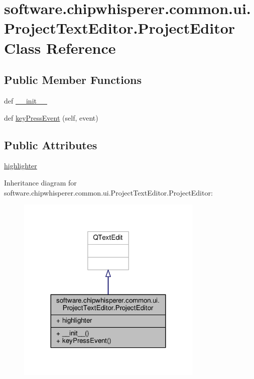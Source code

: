 \hypertarget{classsoftware_1_1chipwhisperer_1_1common_1_1ui_1_1ProjectTextEditor_1_1ProjectEditor}{}\section{software.\+chipwhisperer.\+common.\+ui.\+Project\+Text\+Editor.\+Project\+Editor Class Reference}
\label{classsoftware_1_1chipwhisperer_1_1common_1_1ui_1_1ProjectTextEditor_1_1ProjectEditor}
\subsection*{Public Member Functions}
\begin{DoxyCompactItemize}
\item 
def \hyperlink{classsoftware_1_1chipwhisperer_1_1common_1_1ui_1_1ProjectTextEditor_1_1ProjectEditor_a9266efc29c53c9e44da25e7e957d5aa7}{\+\_\+\+\_\+init\+\_\+\+\_\+}
\item 
def \hyperlink{classsoftware_1_1chipwhisperer_1_1common_1_1ui_1_1ProjectTextEditor_1_1ProjectEditor_abdf3178b676fc32cc788dc1c1e3b54ea}{key\+Press\+Event} (self, event)
\end{DoxyCompactItemize}
\subsection*{Public Attributes}
\begin{DoxyCompactItemize}
\item 
\hyperlink{classsoftware_1_1chipwhisperer_1_1common_1_1ui_1_1ProjectTextEditor_1_1ProjectEditor_aa59d647bfaf0eaa8e18f9dec81e294ac}{highlighter}
\end{DoxyCompactItemize}


Inheritance diagram for software.\+chipwhisperer.\+common.\+ui.\+Project\+Text\+Editor.\+Project\+Editor\+:\nopagebreak
\begin{figure}[H]
\begin{center}
\leavevmode
\includegraphics[width=251pt]{d6/d5b/classsoftware_1_1chipwhisperer_1_1common_1_1ui_1_1ProjectTextEditor_1_1ProjectEditor__inherit__graph}
\end{center}
\end{figure}


